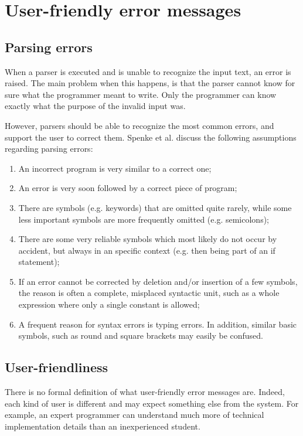
\section{User-friendly error messages}
\label{sec:errors}

\subsection{Parsing errors}
When a parser is executed and is unable to recognize the input text, an error is raised.
The main problem when this happens, is that the parser cannot know for sure what the programmer meant to write.
Only the programmer can know exactly what the purpose of the invalid input was.

However, parsers should be able to recognize the most common errors, and support the user to correct them.
Spenke et al.  discuss the following assumptions regarding parsing errors:
\begin{enumerate}
	\item An incorrect program is very similar to a correct one;
	\item An error is very soon followed by a correct piece of program;
	\item There are symbols (e.g. keywords) that are omitted quite rarely, while some less important symbols are more frequently omitted (e.g. semicolons);
	\item There are some very reliable symbols which most likely do not occur by accident, but always in an specific context (e.g. then being part of an if statement);
	\item  If an error cannot be corrected by deletion and/or insertion of a few symbols, the reason is often a complete, misplaced syntactic unit, such as a whole expression where only a single constant is allowed;
	\item A frequent reason for syntax errors is typing errors. In addition, similar basic symbols, such as round and square brackets may easily be confused.
\end{enumerate}

\subsection{User-friendliness}
There is no formal definition of what user-friendly error messages are.
Indeed, each kind of user is different and may expect something else from the system.
For example, an expert programmer can understand much more of technical implementation details than an inexperienced student.

